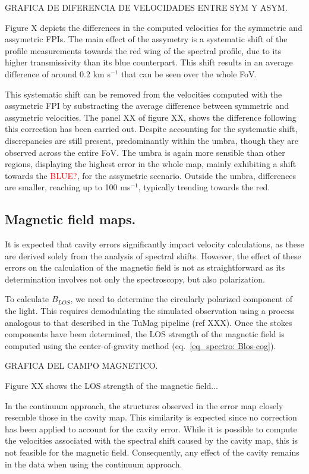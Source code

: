 GRAFICA DE DIFERENCIA DE VELOCIDADES ENTRE SYM Y ASYM. 

Figure X depicts the differences in the computed velocities for the symmetric and assymetric FPIs. The main effect of the assymetry is a systematic shift of the profile measurements towards the red wing of the spectral profile, due to its higher transmissivity than its blue counterpart. This shift results in an average difference of around $0.2$ km s$^{-1}$ that can be seen over the whole FoV. 

This systematic shift can be removed from the velocities computed with the assymetric FPI by substracting the average difference between symmetric and assymetric velocities. The panel XX of figure XX, shows the difference following this correction has been carried out. Despite accounting for the systematic shift, discrepancies are still present, predominantly within the umbra, though they are observed across the entire FoV. The umbra is again more sensible than other regions, displaying the highest error in the whole map, mainly exhibiting a shift towards the \textcolor{red}{BLUE?}, for the assymetric scenario. Outside the umbra, differences are smaller, reaching up to 100 ms$^{-1}$, typically trending towards the red.

\subsection{Magnetic field maps.}

It is expected that cavity errors significantly impact velocity calculations, as these are derived solely from the analysis of spectral shifts. However, the effect of these errors on the calculation of the magnetic field is not as straightforward as its determination involves not only the spectroscopy, but also polarization. 

To calculate $B_{LOS}$, we need to determine the circularly polarized component of the light. This requires demodulating the simulated observation using a process analogous to that described in the TuMag pipeline (ref XXX). Once the stokes components have been determined, the LOS strength of the magnetic field is computed using the center-of-gravity method  (eq.~\eqref{eq_spectro: Blos-cog}). 

GRAFICA DEL CAMPO MAGNETICO.

Figure XX shows the LOS strength of the magnetic field... 

In the continuum approach, the structures observed in the error map closely resemble those in the cavity map. This similarity is expected since no correction has been applied to account for the cavity error. While it is possible to compute the velocities associated with the spectral shift caused by the cavity map, this is not feasible for the magnetic field. Consequently, any effect of the cavity remains in the data when using the continuum approach.

